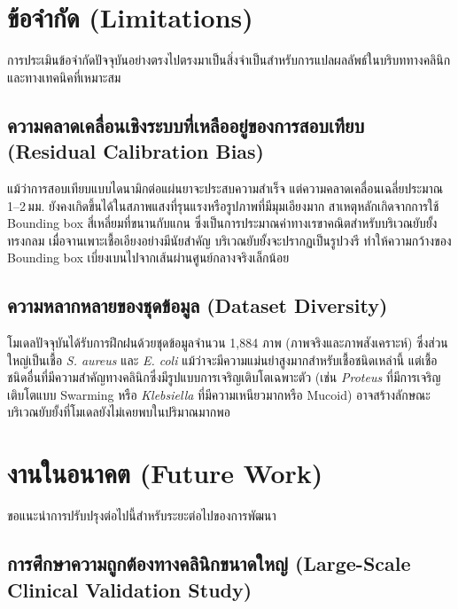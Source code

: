 \section{ข้อจำกัด (Limitations)}
\label{sec:limitations}

การประเมินข้อจำกัดปัจจุบันอย่างตรงไปตรงมาเป็นสิ่งจำเป็นสำหรับการแปลผลลัพธ์ในบริบททางคลินิกและทางเทคนิคที่เหมาะสม

\subsection{ความคลาดเคลื่อนเชิงระบบที่เหลืออยู่ของการสอบเทียบ (Residual Calibration Bias)}

แม้ว่าการสอบเทียบแบบไดนามิกต่อแผ่นยาจะประสบความสำเร็จ แต่ความคลาดเคลื่อนเฉลี่ยประมาณ 1--2\,มม. ยังคงเกิดขึ้นได้ในสภาพแสงที่รุนแรงหรือรูปภาพที่มีมุมเอียงมาก สาเหตุหลักเกิดจากการใช้ Bounding box สี่เหลี่ยมที่ขนานกับแกน ซึ่งเป็นการประมาณค่าทางเรขาคณิตสำหรับบริเวณยับยั้งทรงกลม เมื่อจานเพาะเชื้อเอียงอย่างมีนัยสำคัญ บริเวณยับยั้งจะปรากฏเป็นรูปวงรี ทำให้ความกว้างของ Bounding box เบี่ยงเบนไปจากเส้นผ่านศูนย์กลางจริงเล็กน้อย

\subsection{ความหลากหลายของชุดข้อมูล (Dataset Diversity)}

โมเดลปัจจุบันได้รับการฝึกฝนด้วยชุดข้อมูลจำนวน 1,884 ภาพ (ภาพจริงและภาพสังเคราะห์) ซึ่งส่วนใหญ่เป็นเชื้อ \textit{S. aureus} และ \textit{E. coli} แม้ว่าจะมีความแม่นยำสูงมากสำหรับเชื้อชนิดเหล่านี้ แต่เชื้อชนิดอื่นที่มีความสำคัญทางคลินิกซึ่งมีรูปแบบการเจริญเติบโตเฉพาะตัว (เช่น \textit{Proteus} ที่มีการเจริญเติบโตแบบ Swarming หรือ \textit{Klebsiella} ที่มีความเหนียวมากหรือ Mucoid) อาจสร้างลักษณะบริเวณยับยั้งที่โมเดลยังไม่เคยพบในปริมาณมากพอ

\section{งานในอนาคต (Future Work)}
\label{sec:future_work}

ขอแนะนำการปรับปรุงต่อไปนี้สำหรับระยะต่อไปของการพัฒนา

\subsection{การศึกษาความถูกต้องทางคลินิกขนาดใหญ่ (Large-Scale Clinical Validation Study)}

